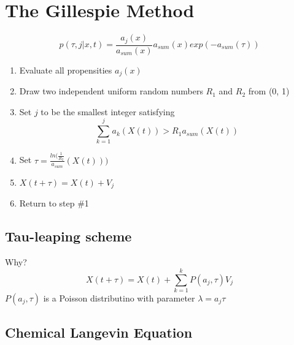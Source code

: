 \documentclass[10pt]{article}
\newenvironment{menumerate}
{
  \begin{enumerate}
  \setlength{\itemsep}{1pt}
  \setlength{\parskip}{0pt}
  \setlength{\parsep}{0pt}}{\end{enumerate}
}
\begin{document}
\section*{The Gillespie Method}

\[ p(\tau,j|x,t) = \frac{a_j(x)}{a_{sum}(x)}a_{sum}(x)exp(-a_{sum}(\tau)) \]

\begin{menumerate}
  \item Evaluate all propensities $a_j(x)$
  \item Draw two independent uniform random numbers $R_1$ and $R_2$ from (0, 1)
  \item Set $j$ to be the smallest integer satisfying \[ \sum_{k=1}^{j} a_k(X(t)) > R_1 a_{sum}(X(t)) \]
  \item Set $\tau = \frac{ln(\frac{1}{R_2}}{a_{sum}}(X(t)))$
  \item $X(t + \tau) = X(t) + V_j$
  \item Return to step \#1
\end{menumerate}

\subsection*{Tau-leaping scheme}
Why? \[ X(t + \tau) = X(t) + \sum_{k=1}^{k}P(a_j, \tau)V_j \]
$P(a_j, \tau)$ is a Poisson distributino with parameter $\lambda = a_j \tau$

\subsection*{Chemical Langevin Equation}
\end{document}
